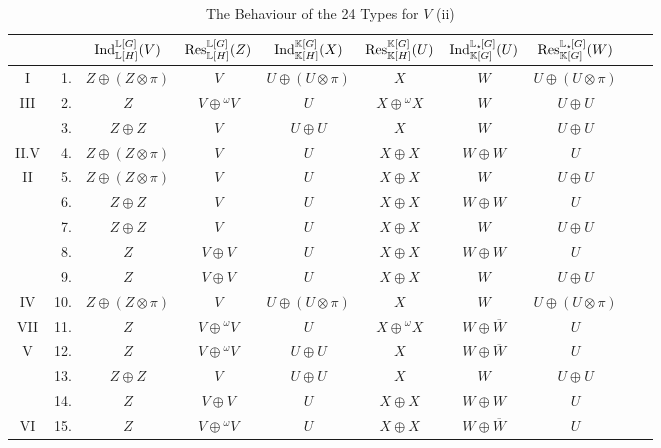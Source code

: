\begin{table}[p] %
    \vspace{4cm}
\centering
\bgroup
\caption{The Behaviour of the 24 Types for $V$ (ii)}
\label{tab:24types4}
\def\arraystretch{1.1}
\begin{tabular}{c r c c c c c c c c}
    \toprule
    & & $\operatorname{Ind}_{{\mathbb L}[H]}^{{\mathbb L}[G]}(V)$ & $\Res_{\bL[H]}^{\bL[G]}(Z)$ & $\operatorname{Ind}_{{\mathbb K}[H]}^{{\mathbb K}[G]}(X)$ & $\Res_{\bK[H]}^{\bK[G]}(U)$ & $\operatorname{Ind}_{{\mathbb K}[G]}^{{\mathbb L}_{\star \hspace{-0.1em}}[G]}(U)$ & $\Res_{\bK[G]}^{\bL_{\star \hspace{-0.1em}}[G]}(W)$ \\
    \midrule
I & 1.  & $Z \oplus (Z \otimes \pi)$ & $V$ & $U \oplus (U \otimes \pi)$ & $X$ & $W$ & $U \oplus (U \otimes \pi)$ \\
III & 2.  & $Z$ & $V \oplus {}^{\omega} V$ & $U$ & $X \oplus {}^{\omega} X$ & $W$ & $U \oplus U$ \\ 
& 3.  & $Z \oplus Z$ & $V$ & $U \oplus U$ & $X$ & $W$ & $U \oplus U$ \\ 
II.V & 4.  & $Z \oplus (Z \otimes \pi)$ & $V$ & $U$ & $X \oplus X$ & $W \oplus W$ & $U$ \\ 
II & 5.  & $Z \oplus (Z \otimes \pi)$ & $V$ & $U$ & $X \oplus X$ & $W$ & $U \oplus U$ \\ 
& 6.  & $Z \oplus Z$ & $V$ &$U$ & $X \oplus X$ & $W \oplus W$ & $U$ \\ 
& 7.  & $Z \oplus Z$ & $V$ & $U$ & $X \oplus X$ & $W$ & $U \oplus U$ \\ 
& 8.  & $Z$ & $V \oplus V$ & $U$ & $X \oplus X$ & $W \oplus W$ & $U$ \\ 
& 9.  & $Z$ & $V \oplus V$ & $U$ & $X \oplus X$ & $W$ & $U \oplus U$ \\ 
IV & 10. & $Z \oplus (Z \otimes \pi)$ & $V$ & $U \oplus (U \otimes \pi)$ & $X$ & $W$ & $U \oplus (U \otimes \pi)$  \\ 
VII & 11. & $Z$ & $V \oplus {}^{\omega} V$ & $U$ & $X \oplus {}^{\omega} X$ & $W \oplus \overline{W}$ & $U$  \\ 
V & 12. & $Z$ & $V \oplus {}^{\omega} V$ & $U \oplus U$ & $X$ & $W \oplus \overline{W}$ & $U$  \\ 
& 13. & $Z \oplus Z$ & $V$ & $U \oplus U$ & $X$ & $W$ & $U \oplus U$   \\ 
& 14. & $Z$ & $V \oplus V$ & $U$ & $X \oplus X$ & $W \oplus W$ & $U$ \\ 
VI & 15. & $Z$ & $V \oplus {}^{\omega} V$ & $U$ & $X \oplus X$ & $W \oplus \overline{W}$ & $U$  \\ 

\end{tabular}
\end{table}
